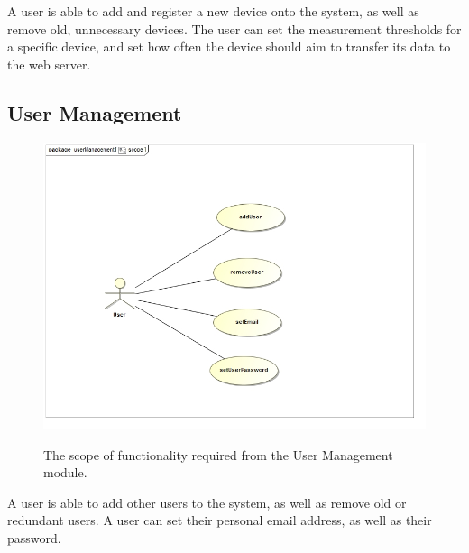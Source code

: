 \documentclass[paper=a4, fontsize=11pt]{scrartcl} %
\begin{document}
		A user is able to add and register a new device onto the system, as well as remove old, unnecessary devices. The user can set the measurement thresholds for a specific device, and set how often the device should aim to transfer its data to the web server.
		
	\subsection{User Management}
		\begin{figure}
			\includegraphics[width=\textwidth]{images/userManagementScope.jpg}  \\
			\caption{The scope of functionality required from the User Management module.}
		\end{figure}
		
		A user is able to add other users to the system, as well as remove old or redundant users. A user can set their personal email address, as well as their password.
		
\end{document}
